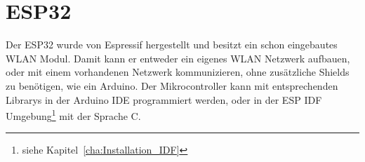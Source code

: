 \section{ESP32}
Der ESP32 wurde von Espressif hergestellt und besitzt ein schon eingebautes WLAN Modul. Damit kann er entweder ein eigenes WLAN Netzwerk aufbauen, oder mit einem vorhandenen Netzwerk kommunizieren, ohne zusätzliche Shields zu benötigen, wie ein Arduino. Der Mikrocontroller kann mit entsprechenden Librarys in der Arduino IDE programmiert werden, oder in der ESP IDF Umgebung\footnote{siehe Kapitel~\ref{cha:Installation_IDF}} mit der Sprache C.
